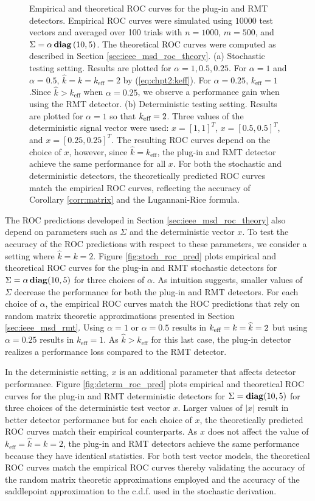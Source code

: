 \begin{figure}
\caption{Empirical and theoretical ROC curves for the plug-in and RMT detectors. Empirical ROC curves were simulated using $10000$ test vectors and averaged over 100 trials with $n=1000$, $m=500$, and $\Sigma =\alpha\mathop{\bf diag}\left(10,5\right)$. The theoretical ROC curves were computed as described in Section \ref{sec:ieee_msd_roc_theory}. (a) Stochastic testing setting. Results are plotted for $\alpha=1,0.5,0.25$. For $\alpha=1$ and $\alpha=0.5$, $\widehat{k}=k=k_\text{eff}=2$ by (\ref{eq:chpt2:keff}). For $\alpha=0.25$, $k_\text{eff}=1$.Since $\widehat{k} > k_{\text{eff}}$ when $\alpha=0.25$, we observe a performance gain when using the RMT detector. (b) Deterministic testing setting. Results are plotted for $\alpha=1$ so that $k_\text{eff}=2$. Three values of the deterministic signal vector were used: $x=[1,1]^T$, $x=[0.5,0.5]^T$, and $x=[0.25,0.25]^T$. The resulting ROC curves depend on the choice of $x$, however, since $\widehat{k} = k_{\text{eff}}$, the plug-in and RMT detector achieve the same performance for all $x$. For both the stochastic and deterministic detectors, the theoretically predicted ROC curves match the empirical ROC curves, reflecting the accuracy of Corollary \ref{corr:matrix} and the Lugannani-Rice formula.}
\vspace{-0.3in}
\end{figure}

The ROC predictions developed in Section \ref{sec:ieee_msd_roc_theory} also depend on parameters such as $\Sigma$ and the deterministic vector $x$. To test the accuracy of the ROC predictions with respect to these parameters, we consider a setting where $\widehat{k}=k = 2$. Figure \ref{fig:stoch_roc_pred} plots empirical and theoretical ROC curves for the plug-in and RMT stochastic detectors for $\Sigma=\alpha\mathop{\bf diag}(10,5)$ for three choices of $\alpha$. As intuition suggests, smaller values of $\Sigma$ decrease the performance for both the plug-in and RMT detectors. For each choice of $\alpha$, the empirical ROC curves match the ROC predictions that rely on random matrix theoretic approximations presented in Section \ref{sec:ieee_msd_rmt}. Using $\alpha=1$ or $\alpha=0.5$ results in $k_\text{eff}=k=\widehat{k}=2$ but using $\alpha=0.25$ results in $k_\text{eff}=1$. As $\widehat{k}>k_\text{eff}$ for this last case, the plug-in detector realizes a performance loss compared to the RMT detector.

In the deterministic setting, $x$ is an additional parameter that affects detector performance. Figure \ref{fig:determ_roc_pred} plots empirical and theoretical ROC curves for the plug-in and RMT deterministic detectors for $\Sigma=\mathop{\bf diag}(10,5)$ for three choices of the deterministic test vector $x$. Larger values of $|x|$ result in better detector performance but for each choice of $x$, the theoretically predicted ROC curves match their empirical counterparts. As $x$ does not affect the value of $k_\text{eff}=\widehat{k}=k=2$, the plug-in and RMT detectors achieve the same performance because they have identical statistics. For both test vector models, the theoretical ROC curves match the empirical ROC curves thereby validating the accuracy of the random matrix theoretic approximations employed and the accuracy of the saddlepoint approximation to the c.d.f. used in the stochastic derivation. 

